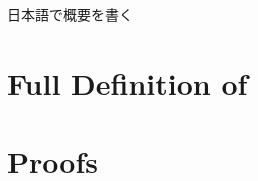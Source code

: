 \documentclass[master,english]{kuisthesis}
\begin{document}
\begin{jabstract}				%
日本語で概要を書く
\end{jabstract}

\tableofcontents				%


















\iffullversion
\appendix

\newtheorem{dfn}{Definition}
\newtheorem{ex}{Example}
\newtheorem{cm}{Comment}
\newcommand{\figheader}[2]{
  \begin{flushleft}
    #2 {\bf \normalsize #1}
\end{flushleft}}

\newpage
\section{Full Definition of \LMD}


\section{Proofs}


\fi
\end{document}
